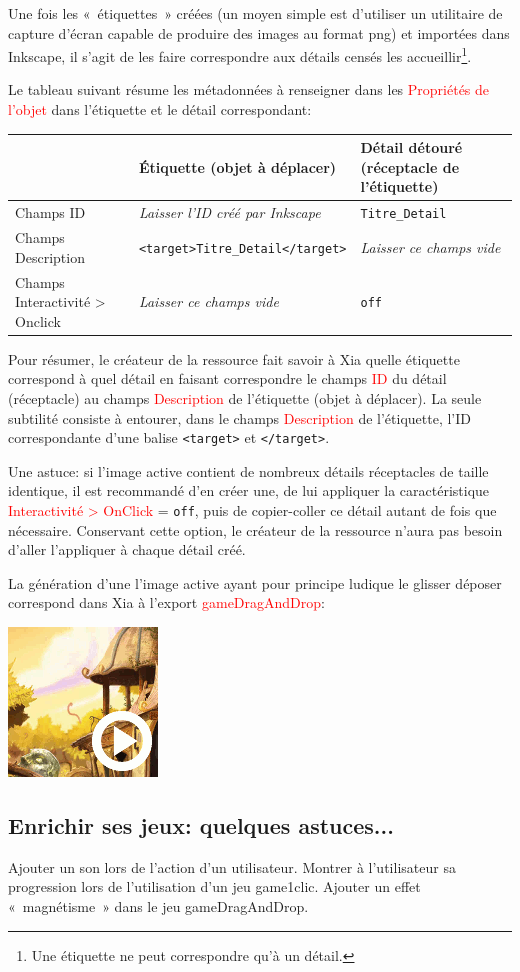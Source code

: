 \documentclass[a4paper,12pt]{report}
\newcommand{\chemin}[1]{\textcolor{red}{#1}}
\begin{document}
Une fois les «~étiquettes~» créées (un moyen simple est d'utiliser un utilitaire de capture d'écran 
capable de produire des images au format png) et importées dans Inkscape, il s'agit de les faire 
correspondre aux détails censés les accueillir\footnote{Une étiquette ne peut correspondre qu'à un détail.}.

Le tableau suivant résume les métadonnées à renseigner dans les \chemin{Propriétés de l'objet}
dans l'étiquette et le détail correspondant:

\begin{center}
\begin{tabular}{|p{}|p{2.5in}|p{1.5in}|}
\hline
 & Étiquette (objet à déplacer) & Détail détouré (réceptacle de l'étiquette)\\
\hline
Champs ID & \textit{Laisser l'ID créé par Inkscape} & \verb|Titre_Detail|\\
\hline
Champs Description & \verb|<target>Titre_Detail</target>| & \textit{Laisser ce champs vide}\\
\hline
Champs Interactivité > Onclick & \textit{Laisser ce champs vide}& \verb|off|\\
\hline
\end{tabular}
\end{center}

Pour résumer, le créateur de la ressource fait savoir à Xia quelle étiquette correspond à quel détail en faisant 
correspondre le champs \chemin{ID} du détail (réceptacle) au champs \chemin{Description} de l'étiquette 
(objet à déplacer). La seule subtilité consiste à entourer, dans le champs \chemin{Description}
de l'étiquette, l'ID correspondante d'une balise \verb|<target>| et \verb|</target>|.

Une astuce: si l'image active contient de nombreux détails réceptacles de taille identique, 
il est recommandé d'en créer une, de lui appliquer la caractéristique \chemin{Interactivité > OnClick} = \verb|off|, 
puis de copier-coller ce détail autant de fois que nécessaire. Conservant cette option, 
le créateur de la ressource n'aura pas besoin d'aller l'appliquer à chaque détail créé.

La génération d'une l'image active ayant pour principe ludique le glisser déposer 
correspond dans Xia à l'export \chemin{gameDragAndDrop}:

\begin{center}
\includegraphics[scale=0.7]{./images/gameDragAndDrop} 
\end{center}

\subsection{Enrichir ses jeux: quelques astuces...}

Ajouter un son lors de l'action d'un utilisateur.
Montrer à l'utilisateur sa progression lors de l'utilisation d'un jeu game1clic.
Ajouter un effet «~magnétisme~» dans le jeu gameDragAndDrop.
\end{document}

